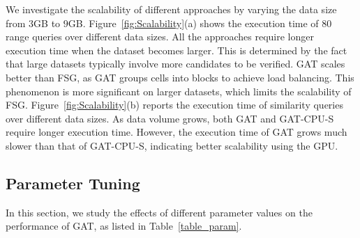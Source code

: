 \documentclass[10pt,conference,letterpaper]{IEEEtran}
\newcommand{\frname}{GAT\xspace }
\newcommand{\idxname}{GTIDX\xspace }
\begin{document}
We investigate the scalability of different approaches by varying the data size from $3$GB to $9$GB.
Figure~\ref{fig:Scalability}(a) shows the execution time of 80 range queries over different data sizes. All the approaches require longer execution time when the dataset becomes larger. This is determined by the fact that large datasets typically involve more candidates to be verified.
\frname scales better than FSG, as \frname groups cells into blocks to achieve load balancing.
This phenomenon is more significant on larger datasets, which limits the scalability of FSG.
%
%
Figure~\ref{fig:Scalability}(b) reports the execution time of similarity queries over different data sizes. As data volume grows, both \frname and \frname-CPU-S require longer execution time. However, the execution time of \frname grows much slower than that of \frname-CPU-S, indicating better scalability using the GPU.


\subsection{Parameter Tuning}

In this section, we study the effects of different parameter values on the performance of \frname, as listed in Table~\ref{table_param}.
\end{document}
